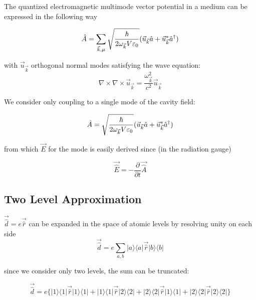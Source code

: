 The quantized electromagnetic multimode vector potential in a medium can be expressed in the following way \cite[271--273]{Novotny2006}

\begin{equation}
	\hat{A} = \sum_{\vec{k}, \mu} \sqrt{\frac{\hbar}{2\omega_{\vec{k}} V \varepsilon_0}} (\vec{u}_{\vec{k}} \hat{a} + \vec{u}^*_{\vec{k}} \hat{a}^\dagger )
\end{equation}

with $\vec{u}_{\vec{k}}$ orthogonal normal modes satisfying the wave equation:
\begin{equation}
	\nabla \times \nabla \times \vec{u}_{\vec{k}} = \frac{\omega_{\vec{k}}^2}{c^2}  \vec{u}_{\vec{k}}
\end{equation}

We consider only coupling to a single mode of the cavity field:

\begin{equation}
	\hat{A} =  \sqrt{\frac{\hbar}{2\omega_{\vec{k}} V \varepsilon_0}} (\vec{u}_{\vec{k}} \hat{a} + \vec{u}^*_{\vec{k}} \hat{a}^\dagger )
\end{equation}

from which $\vec{E}$ for the mode is easily derived since (in the radiation gauge)

\begin{equation}
	\vec{\hat{E}} = -\frac{\partial}{\partial t}\vec{\hat{A}}
\end{equation}

\subsection{Two Level Approximation}

$\vec{\hat{d}} = e \vec{\hat{r}}$ can be expanded in the space of atomic levels by resolving unity on each side
\begin{equation}
	\vec{\hat{d}} = e \sum_{a, b} | a \rangle \langle a | \vec{\hat{r} }| b \rangle \langle b |
\end{equation}

since we consider only two levels, the sum can be truncated:

\begin{equation}
	\vec{\hat{d}} = e\{| 1 \rangle \langle 1|\vec{\hat{r}} | 1 \rangle \langle 1 | + | 1 \rangle \langle 1|\vec{\hat{r}} | 2 \rangle \langle 2 | + | 2 \rangle \langle 2|\vec{\hat{r}} | 1 \rangle \langle 1 | + | 2 \rangle \langle 2|\vec{\hat{r}} | 2 \rangle \langle 2 | \}
\end{equation}

